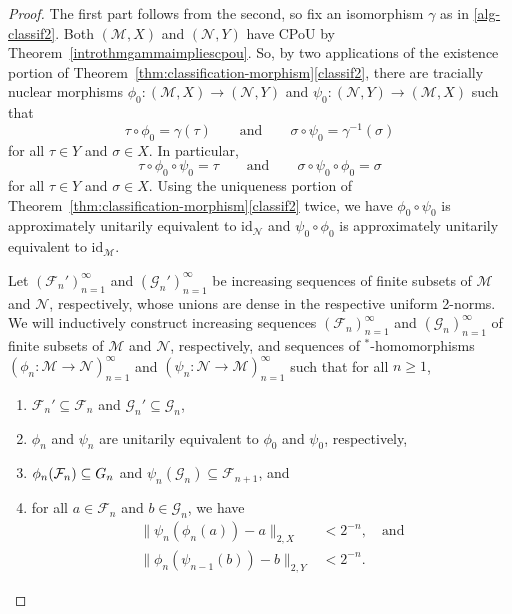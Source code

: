 \documentclass[a4paper,11pt]{amsart}
\theoremstyle{definition}
\numberwithin{equation}{section}
\numberwithin{theorem}{section}
\newcommand{\M}{\mathcal{M}}
\begin{document}
\begin{proof}
	The first part follows from the second, so fix an isomorphism $\gamma$ as in \ref{alg-classif2}. Both $(\M,X)$ and $(\mathcal N,Y)$ have CPoU by Theorem~\ref{introthmgammaimpliescpou}. So, by two applications of the existence portion of Theorem~\ref{thm:classification-morphism}\ref{classif2}, there are tracially nuclear morphisms $\phi_0 \colon (\mathcal M, X) \rightarrow (\mathcal N, Y)$ and $\psi_0 \colon (\mathcal N, Y) \rightarrow (\mathcal M, X)$ such that
	\begin{equation}
		\tau \circ \phi_0 = \gamma(\tau) \qquad \text{and} \qquad \sigma \circ \psi_0 = \gamma^{-1}(\sigma)
	\end{equation}
	for all $\tau \in Y$ and $\sigma \in X$.  In particular,
	\begin{equation}
		\tau \circ \phi_0 \circ \psi_0 = \tau \qquad \text{and} \qquad \sigma \circ \psi_0 \circ \phi _0= \sigma
	\end{equation}
	for all $\tau \in Y$ and $\sigma \in X$.  Using the uniqueness portion of Theorem~\ref{thm:classification-morphism}\ref{classif2} twice, we have $\phi_0 \circ \psi_0$ is approximately unitarily equivalent to $\mathrm{id}_\mathcal N$ and $\psi_0 \circ \phi_0$ is approximately unitarily equivalent to $\mathrm{id}_\mathcal M$.	
	
	Let $(\mathcal F_n')_{n=1}^\infty$ and $(\mathcal G_n')_{n=1}^\infty$ be increasing sequences of finite subsets of $\mathcal M$ and $\mathcal N$, respectively, whose unions are dense in the respective uniform 2-norms.  We will inductively construct increasing sequences $(\mathcal F_n)_{n=1}^\infty$ and $(\mathcal G_n)_{n=1}^\infty$ of finite subsets of $\mathcal M$ and $\mathcal N$, respectively, and sequences of $^*$-homomorphisms $(\phi_n \colon \mathcal M \rightarrow \mathcal N)_{n=1}^\infty$ and $(\psi_n \colon \mathcal N \rightarrow \mathcal M)_{n=1}^\infty$ such that for all $n \geq 1$,		
	\begin{enumerate}
		\item $\mathcal F_n' \subseteq \mathcal F_n$ and $\mathcal G_n' \subseteq \mathcal G_n$,
		\item $\phi_n$ and $\psi_n$ are unitarily equivalent to $\phi_0$ and $\psi_0$, respectively,
		\item $\phi_n(\mathcal F_n) \subseteq \mathcal \mathcal G_n$ and $\psi_n(\mathcal G_n) \subseteq \mathcal F_{n+1}$, and
		\item for all $a \in \mathcal F_n$ and $b \in \mathcal G_n$, we have
		\begin{align}
			\|\psi_n(\phi_n(a)) - a\|_{2, X} &< 2^{-n},\quad \text{and}\label{eq:classification-1} \\
			\|\phi_n(\psi_{n-1}(b)) - b\|_{2, Y} &< 2^{-n}.\label{eq:classification-2}
		\end{align}
	\end{enumerate}
	

\end{proof}
\end{document}
